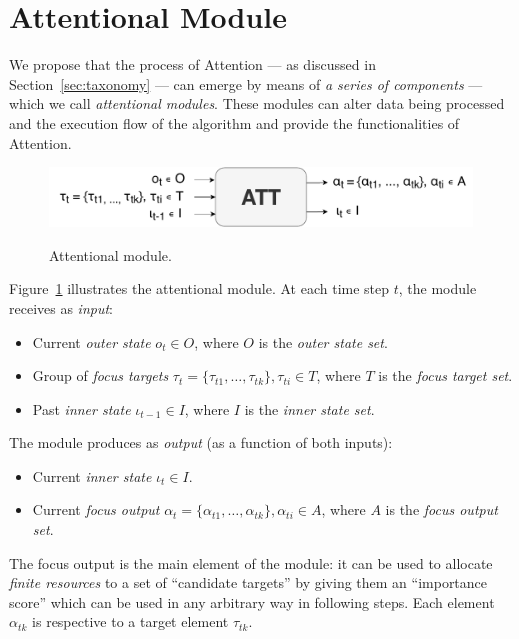 \documentclass[11pt]{article}
\begin{document}
\section{Attentional Module}
We propose that the process of Attention --- as discussed in Section~\ref{sec:taxonomy}  --- can emerge by means of \emph{a series of components} --- which we call \emph{attentional modules}. These modules can alter data being processed and the execution flow of the algorithm and provide the functionalities of Attention.

\begin{figure}[H]
    \centering
    \includegraphics[width=0.9\linewidth]{./img/alt_att_block.pdf}\label{fig:attmodule}
    \caption{Attentional module.}
\end{figure}

Figure~\ref{fig:attmodule} illustrates the attentional module. At each time step $t$, the module receives as \emph{input}:
\begin{itemize}
    \item Current \emph{outer state} $o_t \in O$, where $O$ is the \emph{outer state set}.
    \item Group of \emph{focus targets} $\tau_t = \{\tau_{t1}, \ldots, \tau_{tk}\}, \tau_{ti} \in T$,
        where $T$ is the \emph{focus target set}.
    \item Past \emph{inner state} $\iota_{t-1} \in I$, where $I$ is the \emph{inner state set}.
\end{itemize}

The module produces as \emph{output} (as a function of both inputs):
\begin{itemize}
    \item Current \emph{inner state} $\iota_t \in I$.
    \item Current \emph{focus output} $\alpha_t = \{\alpha_{t1}, \ldots, \alpha_{tk}\}, \alpha_{ti} \in A$,
        where $A$ is the \emph{focus output set}.
\end{itemize}

The focus output is the main element of the module: it can be used to allocate \emph{finite resources} to a set of ``candidate targets'' by giving them an ``importance score'' which can be used in any arbitrary way in following steps.
Each element $\alpha_{tk}$ is respective to a target element $\tau_{tk}$.
\end{document}
